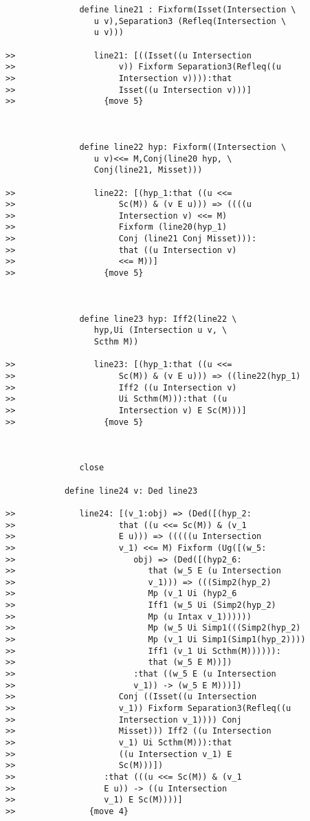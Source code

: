 \documentclass[12pt]{article}
\begin{document}
\begin{verbatim}
               define line21 : Fixform(Isset(Intersection \
                  u v),Separation3 (Refleq(Intersection \
                  u v)))

>>                line21: [((Isset((u Intersection
>>                     v)) Fixform Separation3(Refleq((u
>>                     Intersection v)))):that
>>                     Isset((u Intersection v)))]
>>                  {move 5}



               define line22 hyp: Fixform((Intersection \
                  u v)<<= M,Conj(line20 hyp, \
                  Conj(line21, Misset)))

>>                line22: [(hyp_1:that ((u <<=
>>                     Sc(M)) & (v E u))) => ((((u
>>                     Intersection v) <<= M)
>>                     Fixform (line20(hyp_1)
>>                     Conj (line21 Conj Misset))):
>>                     that ((u Intersection v)
>>                     <<= M))]
>>                  {move 5}



               define line23 hyp: Iff2(line22 \
                  hyp,Ui (Intersection u v, \
                  Scthm M))

>>                line23: [(hyp_1:that ((u <<=
>>                     Sc(M)) & (v E u))) => ((line22(hyp_1)
>>                     Iff2 ((u Intersection v)
>>                     Ui Scthm(M))):that ((u
>>                     Intersection v) E Sc(M)))]
>>                  {move 5}



               close

            define line24 v: Ded line23

>>             line24: [(v_1:obj) => (Ded([(hyp_2:
>>                     that ((u <<= Sc(M)) & (v_1
>>                     E u))) => (((((u Intersection
>>                     v_1) <<= M) Fixform (Ug([(w_5:
>>                        obj) => (Ded([(hyp2_6:
>>                           that (w_5 E (u Intersection
>>                           v_1))) => (((Simp2(hyp_2)
>>                           Mp (v_1 Ui (hyp2_6
>>                           Iff1 (w_5 Ui (Simp2(hyp_2)
>>                           Mp (u Intax v_1))))))
>>                           Mp (w_5 Ui Simp1(((Simp2(hyp_2)
>>                           Mp (v_1 Ui Simp1(Simp1(hyp_2))))
>>                           Iff1 (v_1 Ui Scthm(M)))))):
>>                           that (w_5 E M))])
>>                        :that ((w_5 E (u Intersection
>>                        v_1)) -> (w_5 E M)))])
>>                     Conj ((Isset((u Intersection
>>                     v_1)) Fixform Separation3(Refleq((u
>>                     Intersection v_1)))) Conj
>>                     Misset))) Iff2 ((u Intersection
>>                     v_1) Ui Scthm(M))):that
>>                     ((u Intersection v_1) E
>>                     Sc(M)))])
>>                  :that (((u <<= Sc(M)) & (v_1
>>                  E u)) -> ((u Intersection
>>                  v_1) E Sc(M))))]
>>               {move 4}




\end{verbatim}
\end{document}
